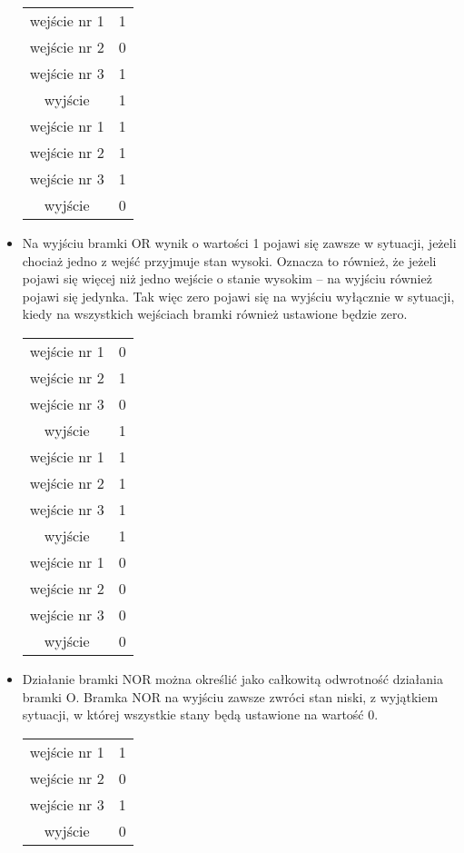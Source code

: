 \documentclass[11pt]{article}
\begin{document}
\begin{itemize}
\begin{table}[h]
\begin{tabular}{|c|c|}
\hline
wejście nr 1&1\\
wejście nr 2&0\\
wejście nr 3&1\\
wyjście&1\\
\hline
\hline
wejście nr 1&1\\
wejście nr 2&1\\
wejście nr 3&1\\
wyjście&0\\
\hline
\end{tabular}
\end{table}
\item Na wyjściu bramki OR wynik o wartości 1 pojawi się zawsze w sytuacji, jeżeli chociaż jedno z wejść przyjmuje stan wysoki. Oznacza to również, że jeżeli pojawi się więcej niż jedno wejście o stanie wysokim – na wyjściu również pojawi się jedynka. Tak więc zero pojawi się na wyjściu wyłącznie w sytuacji, kiedy na wszystkich wejściach bramki również ustawione będzie zero.
\begin{table}[h]
\centering
\begin{tabular}{|c|c|}
\hline
wejście nr 1&0\\
wejście nr 2&1\\
wejście nr 3&0\\
wyjście&1\\
\hline
\hline
wejście nr 1&1\\
wejście nr 2&1\\
wejście nr 3&1\\
wyjście&1\\
\hline
\hline
wejście nr 1&0\\
wejście nr 2&0\\
wejście nr 3&0\\
wyjście&0\\
\hline
\end{tabular}
\end{table}
\newpage
\item  Działanie bramki NOR można określić jako całkowitą odwrotność działania bramki O. Bramka NOR na wyjściu zawsze zwróci stan niski, z wyjątkiem sytuacji, w której wszystkie stany będą ustawione na wartość 0. 
\begin{table}[h]
\centering
\begin{tabular}{|c|c|}
\hline
wejście nr 1&1\\
wejście nr 2&0\\
wejście nr 3&1\\
wyjście&0\\

\end{tabular}
\end{table}
\end{itemize}
\end{document}
